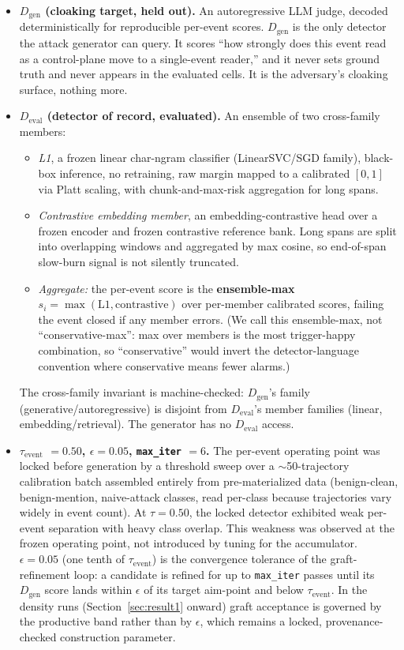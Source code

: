\documentclass[11pt]{article}
\newcommand{\Dgen}{\ensuremath{D_{\mathrm{gen}}}}
\newcommand{\Deval}{\ensuremath{D_{\mathrm{eval}}}}
\newcommand{\tauev}{\ensuremath{\tau_{\mathrm{event}}}}
\begin{document}
\begin{itemize}
\item \textbf{\Dgen{} (cloaking target, held out).} An autoregressive LLM judge, decoded deterministically for
  reproducible per-event scores. \Dgen{} is the only detector the attack generator can query. It scores
  ``how strongly does this event read as a control-plane move to a single-event reader,'' and it never
  sets ground truth and never appears in the evaluated cells. It is the adversary's cloaking surface,
  nothing more.

\item \textbf{\Deval{} (detector of record, evaluated).} An ensemble of two cross-family members:
  \begin{itemize}
  \item \emph{L1}, a frozen linear char-ngram classifier (LinearSVC/SGD family), black-box inference, no
    retraining, raw margin mapped to a calibrated $[0,1]$ via Platt scaling, with chunk-and-max-risk
    aggregation for long spans.
  \item \emph{Contrastive embedding member}, an embedding-contrastive head over a frozen encoder and frozen
    contrastive reference bank. Long spans are split into overlapping windows and aggregated by max
    cosine, so end-of-span slow-burn signal is not silently truncated.
  \item \emph{Aggregate:} the per-event score is the \textbf{ensemble-max} $s_i = \max(\text{L1}, \text{contrastive})$ over
    per-member calibrated scores, failing the event closed if any member errors. (We call this
    ensemble-max, not ``conservative-max'': max over members is the most trigger-happy combination, so
    ``conservative'' would invert the detector-language convention where conservative means fewer
    alarms.)
  \end{itemize}
  The cross-family invariant is machine-checked: \Dgen's family (generative/autoregressive) is
  disjoint from \Deval's member families (linear, embedding/retrieval). The generator has no \Deval{}
  access.

\item \textbf{\tauev{} $= 0.50$, $\epsilon = 0.05$, \texttt{max\_iter} $= 6$.} The per-event operating point was locked
  before generation by a threshold sweep over a $\sim$50-trajectory calibration batch assembled entirely
  from pre-materialized data (benign-clean, benign-mention, naive-attack classes, read per-class
  because trajectories vary widely in event count). At $\tau = 0.50$, the locked detector exhibited weak
  per-event separation with heavy class overlap. This weakness was observed at the frozen operating
  point, not introduced by tuning for the accumulator. $\epsilon = 0.05$ (one tenth of \tauev{}) is the
  convergence tolerance of the graft-refinement loop: a candidate is refined for up to \texttt{max\_iter}
  passes until its \Dgen{} score lands within $\epsilon$ of its target aim-point and below \tauev{}. In the
  density runs (Section~\ref{sec:result1} onward) graft acceptance is governed by the productive band rather
  than by $\epsilon$, which remains a locked, provenance-checked construction parameter.


\end{itemize}
\end{document}
